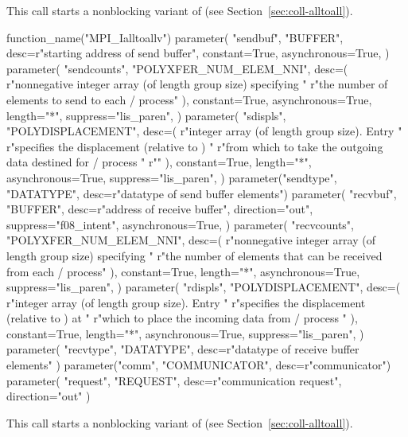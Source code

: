 This call starts a nonblocking variant of  (see
Section~\ref{sec:coll-alltoall}).

\begin{mpi-binding}
    function_name("MPI_Ialltoallv")
    parameter(
        "sendbuf",
        "BUFFER",
        desc=r"starting address of send buffer",
        constant=True,
        asynchronous=True,
    )
    parameter(
        "sendcounts",
        "POLYXFER_NUM_ELEM_NNI",
        desc=(
            r"nonnegative integer array (of length group size) specifying "
            r"the number of elements to send to each \MPI/ process"
        ),
        constant=True,
        asynchronous=True,
        length="*",
        suppress="lis_paren",
    )
    parameter(
        "sdispls",
        "POLYDISPLACEMENT",
        desc=(
            r"integer array (of length group size). Entry  "
            r"specifies the displacement (relative to ) "
            r"from which to take the outgoing data destined for \MPI/ process "
            r""
        ),
        constant=True,
        length="*",
        asynchronous=True,
        suppress="lis_paren",
    )
    parameter("sendtype", "DATATYPE", desc=r"datatype of send buffer elements")
    parameter(
        "recvbuf",
        "BUFFER",
        desc=r"address of receive buffer",
        direction="out",
        suppress="f08_intent",
        asynchronous=True,
    )
    parameter(
        "recvcounts",
        "POLYXFER_NUM_ELEM_NNI",
        desc=(
            r"nonnegative integer array (of length group size) specifying "
            r"the number of elements that can be received from each \MPI/ process"
        ),
        constant=True,
        length="*",
        asynchronous=True,
        suppress="lis_paren",
    )
    parameter(
        "rdispls",
        "POLYDISPLACEMENT",
        desc=(
            r"integer array (of length group size). Entry  "
            r"specifies the displacement (relative to ) at "
            r"which to place the incoming data from \MPI/ process "
        ),
        constant=True,
        length="*",
        asynchronous=True,
        suppress="lis_paren",
    )
    parameter(
        "recvtype", "DATATYPE", desc=r"datatype of receive buffer elements"
    )
    parameter("comm", "COMMUNICATOR", desc=r"communicator")
    parameter(
        "request", "REQUEST", desc=r"communication request", direction="out"
    )
\end{mpi-binding}

This call starts a nonblocking variant of  (see
Section~\ref{sec:coll-alltoall}).



